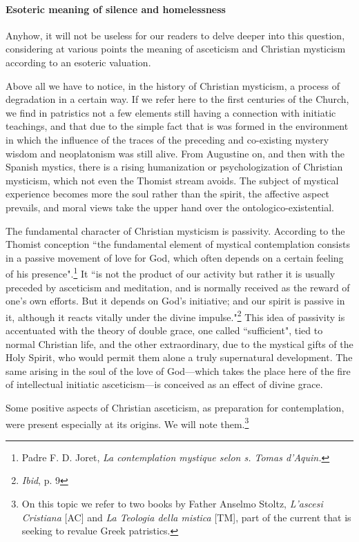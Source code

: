 \paragraph{Esoteric meaning of silence and homelessness}
Anyhow, it will not be useless for our readers to delve deeper into this question, considering at various points the meaning of asceticism and Christian mysticism according to an esoteric valuation.

Above all we have to notice, in the history of Christian mysticism, a process of degradation in a certain way. If we refer here to the first centuries of the Church, we find in patristics not a few elements still having a connection with initiatic teachings, and that due to the simple fact that is was formed in the environment in which the influence of the traces of the preceding and co-existing mystery wisdom and neoplatonism was still alive. From Augustine on, and then with the Spanish mystics, there is a rising humanization or psychologization of Christian mysticism, which not even the Thomist stream avoids. The subject of mystical experience becomes more the soul rather than the spirit, the affective aspect prevails, and moral views take the upper hand over the ontologico-existential.

The fundamental character of Christian mysticism is passivity. According to the Thomist conception ``the fundamental element of mystical contemplation consists in a passive movement of love for God, which often depends on a certain feeling of his presence".\footnote{Padre F. D. Joret, \textit{La contemplation mystique selon s. Tomas d'Aquin.}} It ``is not the product of our activity but rather it is usually preceded by asceticism and meditation, and is normally received as the reward of one's own efforts. But it depends on God's initiative; and our spirit is passive in it, although it reacts vitally under the divine impulse."\footnote{\textit{Ibid}, p. 9} This idea of passivity is accentuated with the theory of double grace, one called ``sufficient", tied to normal Christian life, and the other extraordinary, due to the mystical gifts of the Holy Spirit, who would permit them alone a truly supernatural development. The same arising in the soul of the love of God—which takes the place here of the fire of intellectual initiatic asceticism—is conceived as an effect of divine grace.

Some positive aspects of Christian asceticism, as preparation for contemplation, were present especially at its origins. We will note them.\footnote{On this topic we refer to two books by Father Anselmo Stoltz, \textit{L'ascesi Cristiana} [AC] and \textit{La Teologia della mistica} [TM], part of the current that is seeking to revalue Greek patristics.}

